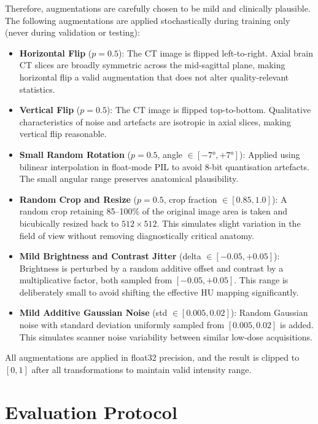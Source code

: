 Therefore, augmentations are carefully chosen to be mild and clinically plausible.
The following augmentations are applied stochastically during training only (never during
validation or testing):

\begin{itemize}
    \item \textbf{Horizontal Flip} ($p = 0.5$): The CT image is flipped left-to-right.
          Axial brain CT slices are broadly symmetric across the mid-sagittal plane,
          making horizontal flip a valid augmentation that does not alter quality-relevant
          statistics.
    \item \textbf{Vertical Flip} ($p = 0.5$): The CT image is flipped top-to-bottom.
          Qualitative characteristics of noise and artefacts are isotropic in axial
          slices, making vertical flip reasonable.
    \item \textbf{Small Random Rotation} ($p = 0.5$, angle $\in [-7°, +7°]$): Applied
          using bilinear interpolation in float-mode PIL to avoid 8-bit quantisation
          artefacts. The small angular range preserves anatomical plausibility.
    \item \textbf{Random Crop and Resize} ($p = 0.5$, crop fraction $\in [0.85, 1.0]$):
          A random crop retaining 85--100\% of the original image area is taken and
          bicubically resized back to $512 \times 512$. This simulates slight variation
          in the field of view without removing diagnostically critical anatomy.
    \item \textbf{Mild Brightness and Contrast Jitter} (delta $\in [-0.05, +0.05]$):
          Brightness is perturbed by a random additive offset and contrast by a
          multiplicative factor, both sampled from $[-0.05, +0.05]$. This range is
          deliberately small to avoid shifting the effective HU mapping significantly.
    \item \textbf{Mild Additive Gaussian Noise} (std $\in [0.005, 0.02]$): Random
          Gaussian noise with standard deviation uniformly sampled from
          $[0.005, 0.02]$ is added. This simulates scanner noise variability between
          similar low-dose acquisitions.
\end{itemize}

All augmentations are applied in float32 precision, and the result is clipped to
$[0, 1]$ after all transformations to maintain valid intensity range.


\section{Evaluation Protocol}
\label{sec:evaluation}

